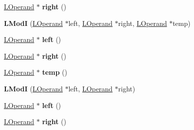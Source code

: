 \begin{DoxyCompactItemize}
\item 
\hyperlink{classv8_1_1internal_1_1_l_operand}{L\+Operand} $\ast$ {\bfseries right} ()\hypertarget{classv8_1_1internal_1_1_l_mod_i_a1cf38930a4ba82683054b45ea0790c91}{}\label{classv8_1_1internal_1_1_l_mod_i_a1cf38930a4ba82683054b45ea0790c91}

\item 
{\bfseries L\+ModI} (\hyperlink{classv8_1_1internal_1_1_l_operand}{L\+Operand} $\ast$left, \hyperlink{classv8_1_1internal_1_1_l_operand}{L\+Operand} $\ast$right, \hyperlink{classv8_1_1internal_1_1_l_operand}{L\+Operand} $\ast$temp)\hypertarget{classv8_1_1internal_1_1_l_mod_i_aae2aab848991edee64cb399cbcd8c9be}{}\label{classv8_1_1internal_1_1_l_mod_i_aae2aab848991edee64cb399cbcd8c9be}

\item 
\hyperlink{classv8_1_1internal_1_1_l_operand}{L\+Operand} $\ast$ {\bfseries left} ()\hypertarget{classv8_1_1internal_1_1_l_mod_i_a4b97251c08cb973560861f2c7cbe18ea}{}\label{classv8_1_1internal_1_1_l_mod_i_a4b97251c08cb973560861f2c7cbe18ea}

\item 
\hyperlink{classv8_1_1internal_1_1_l_operand}{L\+Operand} $\ast$ {\bfseries right} ()\hypertarget{classv8_1_1internal_1_1_l_mod_i_a1cf38930a4ba82683054b45ea0790c91}{}\label{classv8_1_1internal_1_1_l_mod_i_a1cf38930a4ba82683054b45ea0790c91}

\item 
\hyperlink{classv8_1_1internal_1_1_l_operand}{L\+Operand} $\ast$ {\bfseries temp} ()\hypertarget{classv8_1_1internal_1_1_l_mod_i_a61433c24a5b1830ed8577adedbc066b5}{}\label{classv8_1_1internal_1_1_l_mod_i_a61433c24a5b1830ed8577adedbc066b5}

\item 
{\bfseries L\+ModI} (\hyperlink{classv8_1_1internal_1_1_l_operand}{L\+Operand} $\ast$left, \hyperlink{classv8_1_1internal_1_1_l_operand}{L\+Operand} $\ast$right)\hypertarget{classv8_1_1internal_1_1_l_mod_i_a9071f2c8d9c855e3454d9d344a4f231e}{}\label{classv8_1_1internal_1_1_l_mod_i_a9071f2c8d9c855e3454d9d344a4f231e}

\item 
\hyperlink{classv8_1_1internal_1_1_l_operand}{L\+Operand} $\ast$ {\bfseries left} ()\hypertarget{classv8_1_1internal_1_1_l_mod_i_a4b97251c08cb973560861f2c7cbe18ea}{}\label{classv8_1_1internal_1_1_l_mod_i_a4b97251c08cb973560861f2c7cbe18ea}

\item 
\hyperlink{classv8_1_1internal_1_1_l_operand}{L\+Operand} $\ast$ {\bfseries right} ()\hypertarget{classv8_1_1internal_1_1_l_mod_i_a1cf38930a4ba82683054b45ea0790c91}{}\label{classv8_1_1internal_1_1_l_mod_i_a1cf38930a4ba82683054b45ea0790c91}


\end{DoxyCompactItemize}
